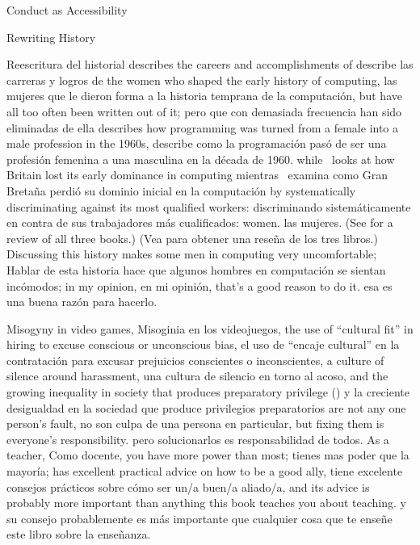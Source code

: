 \begin{aside}{Conduct as Accessibility}
\begin{aside}{Rewriting History}
\begin{aside}{Reescritura del historial}
  \cite{Abba2012} describes the careers and accomplishments of
  \cite{Abba2012} describe las carreras y logros de
  the women who shaped the early history of computing,
  las mujeres que le dieron forma a la historia temprana de la computación,
  but have all too often been written out of it;
  pero que con demasiada frecuencia han sido eliminadas de ella
  \cite{Ensm2003,Ensm2012} describes how programming was turned from a female into a male profession in the 1960s,
   \cite{Ensm2003,Ensm2012} describe como la programación pasó de ser una profesión femenina a una masculina en la década de 1960.
  while~\cite{Hick2018} looks at how Britain lost its early dominance in computing
  mientras~\cite{Hick2018} examina como Gran Bretaña perdió su dominio inicial en la computación
  by systematically discriminating against its most qualified workers:
  discriminando sistemáticamente en contra de sus trabajadores más cualificados:
  women.
  las mujeres.
  (See \cite{Milt2018} for a review of all three books.)
  (Vea \cite{Milt2018} para obtener una reseña de los tres libros.)
  Discussing this history makes some men in computing very uncomfortable;
  Hablar de esta historia hace que algunos hombres en computación se sientan incómodos;
  in my opinion,
  en mi opinión,
  that's a good reason to do it.
  esa es una buena razón para hacerlo.
\end{aside}

Misogyny in video games,
Misoginia en los videojuegos,
the use of ``cultural fit'' in hiring to excuse conscious or unconscious bias,
el uso de ``encaje cultural'' en la contratación para excusar prejuicios conscientes o inconscientes,
a culture of silence around harassment,
una cultura de silencio en torno al acoso,
and the growing inequality in society that produces preparatory privilege ()
y la creciente desigualdad en la sociedad que produce privilegios preparatorios
are not any one person's fault,
no son culpa de una persona en particular,
but fixing them is everyone's responsibility.
pero solucionarlos es responsabilidad de todos.
As a teacher,
Como docente,
you have more power than most;
tienes mas poder que la mayoría;
has excellent practical advice on how to be a good ally,
tiene excelente consejos prácticos sobre cómo ser un/a buen/a aliado/a,
and its advice is probably more important than anything this book teaches you about teaching.
y su consejo probablemente es más importante que cualquier cosa que te enseñe este libro sobre la enseñanza.


\end{aside}
\end{aside}
